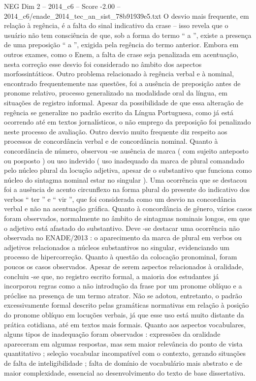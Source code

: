 \begin{textsample}{NEG Dim 2 – 2014\_c6 – Score -2.00 – 2014\_c6/enade\_2014\_tec\_an\_sist\_78b91939e5.txt}
O desvio mais frequente, em relação à regência, é a falta do sinal indicativo da crase – isso revela que o usuário não tem consciência de que, sob a forma do termo “ a ”, existe a presença de uma preposição “ a ”, exigida pela regência do termo anterior.
Embora em outros exames, como o Enem, a falta de crase seja penalizada em acentuação, nesta correção esse desvio foi considerado no âmbito dos aspectos morfossintáticos.
Outro problema relacionado à regência verbal e à nominal, encontrado frequentemente nas questões, foi a ausência de preposição antes de pronome relativo, processo generalizado na modalidade oral da língua, em situações de registro informal.
Apesar da possibilidade de que essa alteração de regência se generalize no padrão escrito da Língua Portuguesa, como já está ocorrendo até em textos jornalísticos, o não emprego da preposição foi penalizado neste processo de avaliação.
Outro desvio muito frequente diz respeito aos processos de concordância verbal e de concordância nominal.
Quanto à concordância de número, observou -se ausência de marca ( com sujeito anteposto ou posposto ) ou uso indevido ( uso inadequado da marca de plural comandado pelo núcleo plural da locução adjetiva, apesar de o substantivo que funciona como núcleo do sintagma nominal estar no singular ).
Uma ocorrência que se destacou foi a ausência de acento circunflexo na forma plural do presente do indicativo dos verbos “ ter ” e “ vir ”, que foi considerada como um desvio na concordância verbal e não na acentuação gráfica.
Quanto à concordância de gênero, vários casos foram observados, normalmente no âmbito de sintagmas nominais longos, em que o adjetivo está afastado do substantivo.
Deve -se destacar uma ocorrência não observada no ENADE/2013 : o aparecimento da marca de plural em verbos ou adjetivos relacionados a núcleos substantivos no singular, evidenciando um processo de hipercorreção.
Quanto à questão da colocação pronominal, foram poucos os casos observados.
Apesar de serem aspectos relacionados à oralidade, concluiu -se que, no registro escrito formal, a maioria dos estudantes já incorporou regras como a não introdução da frase por um pronome oblíquo e a próclise na presença de um termo atrator.
Não se adotou, entretanto, o padrão excessivamente formal descrito pelas gramáticas normativas em relação à posição do pronome oblíquo em locuções verbais, já que esse uso está muito distante da prática cotidiana, até em textos mais formais.
Quanto aos aspectos vocabulares, alguns tipos de inadequação foram observados : expressões da oralidade apareceram em algumas respostas, mas sem maior relevância do ponto de vista quantitativo ; seleção vocabular incompatível com o contexto, gerando situações de falta de inteligibilidade ; falta de domínio de vocabulário mais abstrato e de maior complexidade, essencial ao desenvolvimento do texto de base dissertativa.

\end{textsample}
